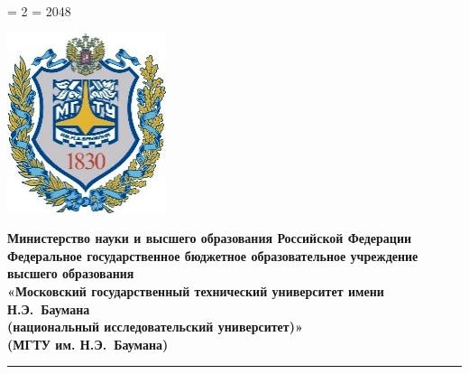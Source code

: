 \documentclass[12pt,a4paper,oneside]{report}
\begin{document}
	
	
	
	
	\setcounter{tocdepth}{4} %
	\righthyphenmin = 2
	\tolerance = 2048
	
	
	\thispagestyle{empty}
	
	\thispagestyle{empty}
	\noindent \begin{minipage}{0.15\textwidth}
		\includegraphics[width=\linewidth]{b_logo}
	\end{minipage}
	\noindent\begin{minipage}{0.9\textwidth}\centering
		\textbf{Министерство науки и высшего образования Российской Федерации}\\
		\textbf{Федеральное государственное бюджетное образовательное учреждение высшего образования}\\
		\textbf{«Московский государственный технический университет имени Н.Э.~Баумана}\\
		\textbf{(национальный исследовательский университет)»}\\
		\textbf{(МГТУ им. Н.Э.~Баумана)}
	\end{minipage}
	\noindent\rule{18cm}{3pt}
	\newline\newline
\end{document}
